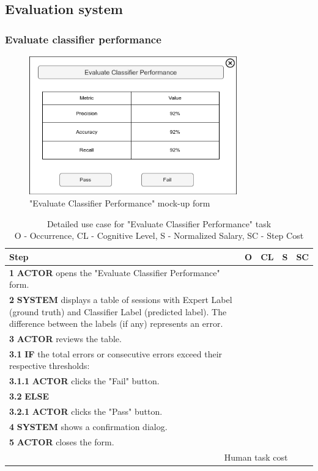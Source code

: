 \subsection{Evaluation system}

\subsubsection{Evaluate classifier performance}

\begin{figure}[H]
\centering
\includegraphics[width=0.8\textwidth]{figures/evaluate_classifier_performance.png}
\caption{"Evaluate Classifier Performance" mock-up form}
\end{figure}

\begin{table}[H]
\centering
\begin{tabularx}{\textwidth}{|X|c|c|c|c|}
\hline
\textbf{Step} & \textbf{O} & \textbf{CL} & \textbf{S} & \textbf{SC} \\
\hline
\textbf{1} \textbf{ACTOR} opens the "Evaluate Classifier Performance" form. & & & & \\
\hline
\textbf{2} \textbf{SYSTEM} displays a table of sessions with Expert Label (ground truth) and Classifier Label (predicted label). 
The difference between the labels (if any) represents an error. & & & & \\
\hline
\textbf{3} \textbf{ACTOR} reviews the table. & & & & \\
\hline
\textbf{3.1} \textbf{IF} the total errors or consecutive errors exceed their respective thresholds: & & & & \\
\hline
\textbf{3.1.1} \textbf{ACTOR} clicks the "Fail" button. & & & & \\
\hline
\textbf{3.2} \textbf{ELSE} & & & & \\
\hline
\textbf{3.2.1} \textbf{ACTOR} clicks the "Pass" button. & & & & \\
\hline
\textbf{4} \textbf{SYSTEM} shows a confirmation dialog. & & & & \\
\hline
\textbf{5} \textbf{ACTOR} closes the form. & & & & \\
\hline
\multicolumn{4}{|r|}{Human task cost} & \\
\hline
\end{tabularx}
\caption{Detailed use case for "Evaluate Classifier Performance" task\\ 
O - Occurrence, CL - Cognitive Level, S - Normalized Salary, SC - Step Cost}
\label{table:evaluate_classifier_performance}
\end{table}
